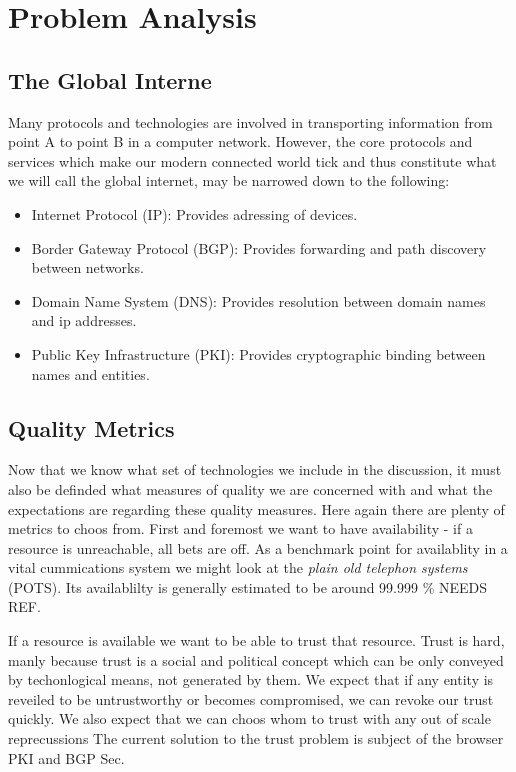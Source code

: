 \documentclass[../eva1_scion.tex]{subfiles}
\begin{document}
\chapter{Problem Analysis}\label{ch:analysis}

\section{The Global Interne}%
\label{sec:the_global_internet}

Many protocols and technologies are involved in transporting information from point A to point B in a computer network. However, the core protocols and services which make our modern connected world tick and thus constitute what we will call the global internet, may be narrowed down to the following:

\begin{itemize}
    \item Internet Protocol (IP): Provides adressing of devices.
    \item Border Gateway Protocol (BGP): Provides forwarding and path discovery between networks.
    \item Domain Name System (DNS): Provides resolution between domain names and ip addresses.
    \item Public Key Infrastructure (PKI): Provides cryptographic binding between names and entities.
\end{itemize}

\section{Quality Metrics}%
\label{sec:quality_metrics}

Now that we know what set of technologies we include in the discussion, it must also be definded what measures of quality we are concerned with and what the expectations are regarding these quality measures. Here again there are plenty of metrics to choos from. First and foremost we want to have availability - if a resource is unreachable, all bets are off. As a benchmark point for availablity in a vital cummications system we might look at the \textit{plain old telephon systems} (POTS). Its availablilty is generally estimated to be around 99.999 \% NEEDS REF.

If a resource is available we want to be able to trust that resource. Trust is hard, manly because trust is a social and political concept which can be only conveyed by techonlogical means, not generated by them. We expect that if any entity is reveiled to be untrustworthy or becomes compromised, we can revoke our trust quickly. We also expect that we can choos whom to trust with any out of scale reprecussions The current solution to the trust problem is subject of the browser PKI and BGP Sec.
\end{document}
